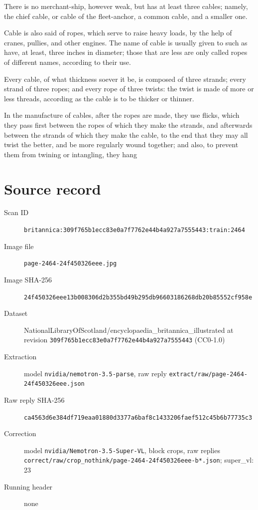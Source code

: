 \documentclass{article}
\begin{document}
There is no merchant-ship, however weak, but has at least three cables; namely, the chief cable, or cable of the fleet-anchor, a common cable, and a smaller one.

Cable is also said of ropes, which serve to raise heavy loads, by the help of cranes, pullies, and other engines. The name of cable is usually given to such as have, at least, three inches in diameter; those that are less are only called ropes of different names, according to their use.

Every cable, of what thickness soever it be, is composed of three strands; every strand of three ropes; and every rope of three twists: the twist is made of more or less threads, according as the cable is to be thicker or thinner.

In the manufacture of cables, after the ropes are made, they use flicks, which they pass first between the ropes of which they make the strands, and afterwards between the strands of which they make the cable, to the end that they may all twist the better, and be more regularly wound together; and also, to prevent them from twining or intangling, they hang


\section*{Source record}
\begin{description}
\item[Scan ID] \texttt{britannica:309f765b1ecc83e0a7f7762e44b4a927a7555443:train:2464}
\item[Image file] \texttt{page-2464-24f450326eee.jpg}
\item[Image SHA-256] \texttt{24f450326eee13b008306d2b355bd49b295db96603186268db20b85552cf958e}
\item[Dataset] NationalLibraryOfScotland/encyclopaedia\_britannica\_illustrated at revision \texttt{309f765b1ecc83e0a7f7762e44b4a927a7555443} (CC0-1.0)
\item[Extraction] model \texttt{nvidia/nemotron-3.5-parse}, raw reply \texttt{extract/raw/page-2464-24f450326eee.json}
\item[Raw reply SHA-256] \texttt{ca4563d6e384df719eaa01880d3377a6baf8c1433206faef512c45b6b77735c3}
\item[Correction] model \texttt{nvidia/Nemotron-3.5-Super-VL}, block crops, raw replies \texttt{correct/raw/crop\_nothink/page-2464-24f450326eee-b*.json}; super\_vl: 23
\item[Running header] none
\end{description}
\end{document}
